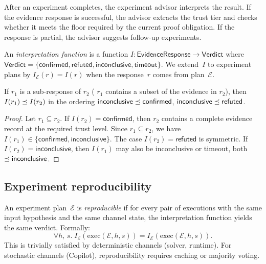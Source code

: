 \documentclass[11pt]{article}
\begin{document}
After an experiment completes, the experiment advisor
interprets the result.  If the evidence response is
successful, the advisor extracts the trust tier and
checks whether it meets the floor required by the
current proof obligation.  If the response is partial,
the advisor suggests follow-up experiments.

\begin{definition}\label{def:interp}
An \emph{interpretation function} is a function
$I \colon \mathsf{EvidenceResponse} \to \mathsf{Verdict}$
where $\mathsf{Verdict} = \{\mathsf{confirmed},
\mathsf{refuted}, \mathsf{inconclusive}, \mathsf{timeout}\}$.
We extend~$I$ to experiment plans by
$I_{\mathcal{E}}(r) = I(r)$ when the response~$r$ comes
from plan~$\mathcal{E}$.
\end{definition}

\begin{lemma}\label{lem:interpmono}
If $r_1$ is a sub-response of $r_2$ (\ie{} $r_1$ contains
a subset of the evidence in $r_2$), then
$I(r_1) \preceq I(r_2)$ in the ordering
$\mathsf{inconclusive} \preceq \mathsf{confirmed}$,
$\mathsf{inconclusive} \preceq \mathsf{refuted}$.
\end{lemma}
\begin{proof}
Let $r_1 \subseteq r_2$.  If $I(r_2) = \mathsf{confirmed}$,
then $r_2$ contains a complete evidence record at the required
trust level.  Since $r_1 \subseteq r_2$, we have
$I(r_1) \in \{\mathsf{confirmed}, \mathsf{inconclusive}\}$.
The case $I(r_2) = \mathsf{refuted}$ is symmetric.  If
$I(r_2) = \mathsf{inconclusive}$, then $I(r_1)$ may also
be inconclusive or timeout, both $\preceq \mathsf{inconclusive}$.
\end{proof}

\subsection{Experiment reproducibility}

\begin{definition}\label{def:repro}
An experiment plan~$\mathcal{E}$ is \emph{reproducible} if
for every pair of executions with the same input hypothesis
and the same channel state, the interpretation function yields
the same verdict.  Formally:
\[
  \forall h,\, s.\;
  I_{\mathcal{E}}(\mathrm{exec}(\mathcal{E}, h, s))
  = I_{\mathcal{E}}(\mathrm{exec}(\mathcal{E}, h, s)).
\]
This is trivially satisfied by deterministic channels (solver,
runtime).  For stochastic channels (Copilot), reproducibility
requires caching or majority voting.
\end{definition}
\end{document}
